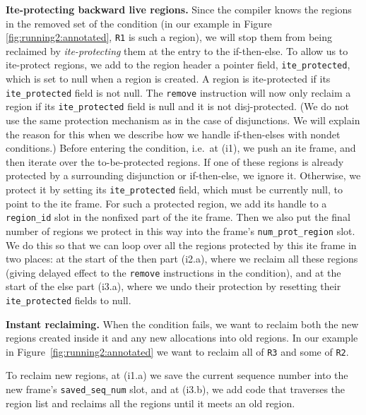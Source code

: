\documentclass{tlp}
\newcommand{\code}[1]{{\tt#1}}
\begin{document}
\noindent\textbf{Ite-protecting backward live regions.}
Since the compiler knows the regions in the removed set of the condition
(in our example in Figure \ref{fig:running2:annotated},
\code{R1} is such a region),
we will stop them from being reclaimed by \emph{ite-protecting} them
at the entry to the if-then-else.
To allow us to ite-protect regions,
we add to the region header a pointer field, \code{ite\_protected},
which is set to null when a region is created.
A region is ite-protected if its \code{ite\_protected} field is not null.
The \code{remove} instruction will now only reclaim a region if its
\code{ite\_protected} field is null and it is not disj-protected.
(We do not use the same protection mechanism as in the case of disjunctions.
We will explain the reason for this
when we describe how we handle if-then-elses with nondet conditions.)
Before entering the condition, i.e.\ at (i1), we push an ite frame,
and then iterate over the to-be-protected regions.
If one of these regions is already protected
by a surrounding disjunction or if-then-else,
we ignore it.
Otherwise, we protect it
by setting its \code{ite\_protected} field, which must be currently null,
to point to the ite frame.
For such a protected region,
we add its handle to a \code{region\_id} slot
in the nonfixed part of the ite frame.
Then we also put the final number of regions we protect in this way
into the frame's \code{num\_prot\_region} slot.
We do this so that
we can loop over all the regions protected by this ite frame in two places:
at the start of the then part (i2.a), where we reclaim all these regions
(giving delayed effect to the \code{remove} instructions in the condition),
and at the start of the else part (i3.a), where we undo their protection
by resetting their \code{ite\_protected} fields to null.

\noindent\textbf{Instant reclaiming.}
When the condition fails, we want to reclaim
both the new regions created inside it
and any new allocations into old regions.
In our example in Figure~\ref{fig:running2:annotated}
we want to reclaim all of \code{R3} and some of \code{R2}.

To reclaim new regions,
at (i1.a) we save the current sequence number
into the new frame's \code{saved\_seq\_num} slot,
and at (i3.b), we add code that traverses the region list
and reclaims all the regions until it meets an old region.
\end{document}
